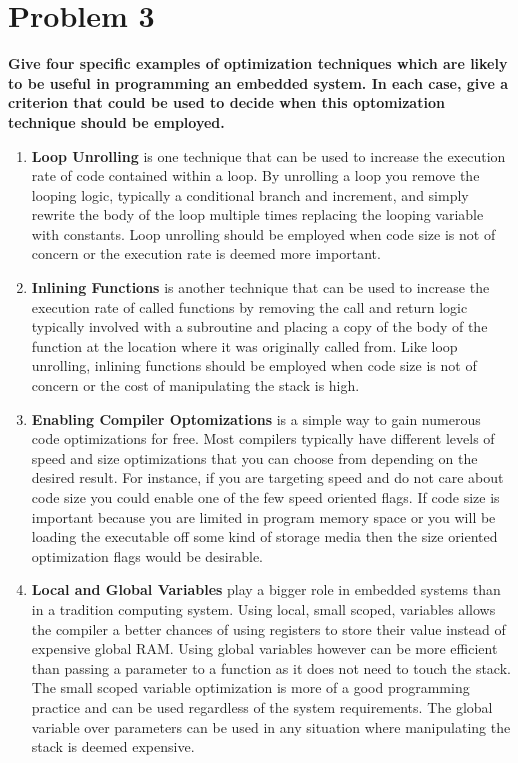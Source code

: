 \documentclass{article}
\begin{document}
\newpage
\section*{Problem 3}
\textbf{Give four specific examples of optimization techniques which are likely
    to be useful in programming an embedded system. In each case, give a
    criterion that could be used to decide when this optomization technique
should be employed.}
\begin{enumerate}
    \item \textbf{Loop Unrolling} is one technique that can be used to increase the execution rate of code contained within a loop.
        By unrolling a loop you remove the looping logic, typically a conditional branch and increment, and simply rewrite the
        body of the loop multiple times replacing the looping variable with constants. Loop unrolling should be employed when code
        size is not of concern or the execution rate is deemed more important.
    \item \textbf{Inlining Functions} is another technique that can be used to increase the execution rate of called functions by
        removing the call and return logic typically involved with a subroutine and placing a copy of the body of the function
        at the location where it was originally called from. Like loop unrolling, inlining functions should be employed when code
        size is not of concern or the cost of manipulating the stack is high.
    \item \textbf{Enabling Compiler Optomizations} is a simple way to gain numerous code optimizations for free. Most compilers
        typically have different levels of speed and size optimizations that you can choose from depending on the desired result.
        For instance, if you are targeting speed and do not care about code size you could enable one of the few speed oriented flags.
        If code size is important because you are limited in program memory space or you will be loading the executable off some kind
        of storage media then the size oriented optimization flags would be desirable.
    \item \textbf{Local and Global Variables} play a bigger role in embedded systems than in a tradition computing system. Using local, small
        scoped, variables allows the compiler a better chances of using registers to store their value instead of expensive global RAM. Using global
        variables however can be more efficient than passing a parameter to a function as it does not need to touch the stack. The small scoped variable
        optimization is more of a good programming practice and can be used regardless of the system requirements. The global variable over parameters
        can be used in any situation where manipulating the stack is deemed expensive.
\end{enumerate}
\end{document}
